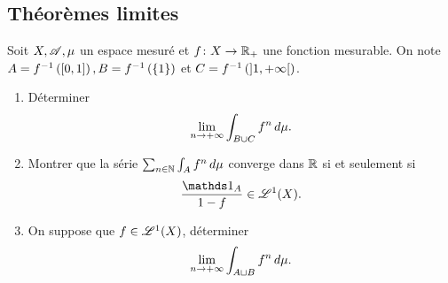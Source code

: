 \subsection*{Théorèmes limites}
\begin{td-exo}[] %
    Soit \(X,\mathscr{A}, \mu\) un espace mesuré et \(f\colon X\to\mathbb{R}_+\)
    une fonction mesurable. On note \(A=f^{-1}\left(\mathopen{}\left[0,1\right]\mathclose{}\right),
    B=f^{-1}\left(\{1\}\right)\) et \(C=f^{-1}\left(\mathopen{}\left]1,+\infty\right[\mathclose{}\right)\).
    \begin{enumerate}
        \item Déterminer
        \begin{equation*}
            \lim_{n\to+\infty}\int_{B\cup C}f^n\mathop{}\!{d}\mu.
        \end{equation*}
        \item Montrer que la série \(\sum_{n\in\mathbb{N}}\int_A f^n\mathop{}\!{d}\mu\) converge
        dans \(\mathbb{R}\) si et seulement si 
        \begin{equation*}
            \frac{\one_A}{1-f}\in \scr L^1(X).
        \end{equation*}
        \item On suppose que \(f\in\mathscr{L}^1(X)\), déterminer
        \begin{equation*}
            \lim_{n\to+\infty}\int_{A\sqcup B} f^n\mathop{}\!{d}\mu.
        \end{equation*}
    \end{enumerate}
\end{td-exo}
